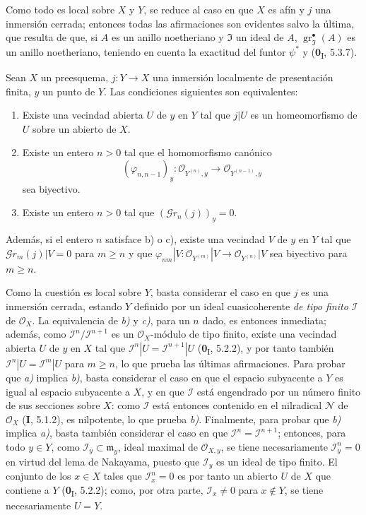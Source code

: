 Como todo es local sobre $X$ y $Y$, se reduce al caso en que $X$ es afín y $j$
una inmersión cerrada; entonces todas las afirmaciones son evidentes salvo la
última, que resulta de que, si $A$ es un anillo noetheriano y
$\mathfrak{I}$ un ideal de $A$, $\operatorname{gr}_{\mathfrak{I}}^\bullet(A)$
es un anillo noetheriano, teniendo en cuenta la exactitud del funtor $\psi^*$ y
(\textbf{0}\textsubscript{I}, 5.3.7).


\begin{proposition}[16.1.9]
\label{IV.16.1.9}

Sean $X$ un preesquema, $j:Y\to X$ una inmersión localmente de presentación
finita, $y$ un punto de $Y$. Las condiciones siguientes son equivalentes:
\begin{enumerate}
\item[\textup{a)}] Existe una vecindad abierta $U$ de $y$ en $Y$ tal que $j|U$ es
un homeomorfismo de $U$ sobre un abierto de $X$.
\item[\textup{b)}] Existe un entero $n>0$ tal que el homomorfismo canónico
\[
  (\varphi_{n,n-1})_y:
  \mathcal{O}_{Y^{(n)},y}\longrightarrow\mathcal{O}_{Y^{(n-1)},y}
\]
sea biyectivo.
\item[\textup{c)}] Existe un entero $n>0$ tal que
$(\mathscr{G}r_n(j))_y=0$.
\end{enumerate}
Además, si el entero $n$ satisface \textup{b)} o \textup{c)}, existe una vecindad $V$ de $y$
en $Y$ tal que $\mathscr{G}r_m(j)|V=0$ para $m\geq n$ y que
$\varphi_{nm}|V:\mathcal{O}_{Y^{(m)}}|V\to\mathcal{O}_{Y^{(n)}}|V$ sea
biyectivo para $m\geq n$.
\end{proposition}

Como la cuestión es local sobre $Y$, basta considerar el caso en que $j$ es una
inmersión cerrada, estando $Y$ definido por un ideal cuasicoherente \emph{de tipo finito}
$\mathscr{I}$ de $\mathcal{O}_X$. La equivalencia de \emph{b)} y \emph{c)}, para un $n$ dado,
es entonces inmediata; además, como
$\mathscr{I}^n/\mathscr{I}^{n+1}$ es un $\mathcal{O}_X$-módulo de tipo finito,
existe una vecindad abierta $U$ de $y$ en $X$ tal que
$\mathscr{I}^n|U=\mathscr{I}^{n+1}|U$ (\textbf 0\textsubscript{I}, 5.2.2), y por tanto también
$\mathscr{I}^n|U=\mathscr{I}^m|U$ para $m\geq n$, lo que prueba las últimas
afirmaciones. Para probar que \emph{a)} implica \emph{b)}, basta considerar el caso en que
el espacio subyacente a $Y$ es igual al espacio subyacente a $X$, y en que
$\mathscr{I}$ está engendrado por un número finito de sus secciones sobre $X$:
como $\mathscr{I}$ está entonces contenido en el nilradical $\mathscr{N}$ de
$\mathcal{O}_X$ (\textbf I, 5.1.2), es nilpotente, lo que prueba \emph{b)}. Finalmente, para
probar que \emph{b)} implica \emph{a)}, basta también considerar el caso en que
$\mathscr{I}^n=\mathscr{I}^{n+1}$; entonces, para todo $y\in Y$, como
$\mathscr{I}_y\subset\mathfrak{m}_y$, ideal maximal de
$\mathcal{O}_{X,y}$, se tiene necesariamente $\mathscr{I}_y^n=0$ en virtud del
lema de Nakayama, puesto que $\mathscr{I}_y$ es un ideal de tipo finito.
El conjunto de los $x\in X$ tales que $\mathscr{I}_x^n=0$ es por tanto un abierto $U$ de
$X$ que contiene a $Y$ (\textbf 0\textsubscript{I}, 5.2.2); como, por otra parte,
$\mathscr{I}_x\neq 0$ para $x\notin Y$, se tiene necesariamente $U=Y$.

